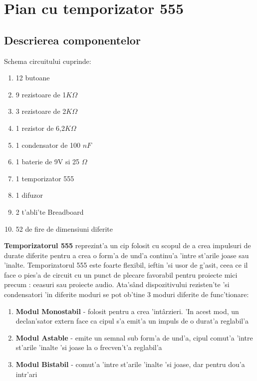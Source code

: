 \chapter{Pian cu temporizator 555}
\section{Descrierea componentelor}

\vspace{5mm}
Schema circuitului cuprinde: 
\begin{enumerate}
\color{blue}
\item 12 butoane
\item 9 rezistoare de 1$K\Omega$
\item 3 rezistoare de 2$K\Omega$
\item 1 rezistor de 6,2$K\Omega$
\item 1 condensator de 100 $nF$
\item 1 baterie de 9V si 25 $\Omega$
\item 1 temporizator 555
\item 1 difuzor
\item 2 t'abli'te Breadboard
\item 52 de fire de dimensiuni diferite
\end{enumerate}

\vspace{5mm}
\myindent
\textbf{Temporizatorul 555} reprezint'a un cip folosit cu scopul de a crea impulsuri de durate diferite pentru a crea o form'a de und'a continu'a 'intre st'arile joase sau 'inalte. Temporizatorul 555 este foarte flexibil, ieftin 'si usor de g'asit, ceea ce il face o pies'a de circuit cu un punct de plecare favorabil pentru proiecte mici precum : ceasuri sau proiecte audio. Ata's\^and dispozitivului rezisten'te 'si condensatori 'in diferite moduri se pot ob'tine 3 moduri diferite de func'tionare:

\vspace{5mm}
\begin{enumerate}
\color{violet}
\item \textbf{Modul Monostabil} - folosit pentru a crea 'int\^arzieri. 'In acest mod, un declan'sator extern face ca cipul s'a emit'a un impuls de o durat'a reglabil'a
\item \textbf{Modul Astable} - emite un semnal sub form'a de und'a, cipul comut'a 'intre st'arile 'inalte 'si joase la o frecven't'a reglabil'a
\item \textbf{Modul Bistabil} - comut'a 'intre st'arile 'inalte 'si joase, dar pentru dou'a intr'ari 
\end{enumerate}

